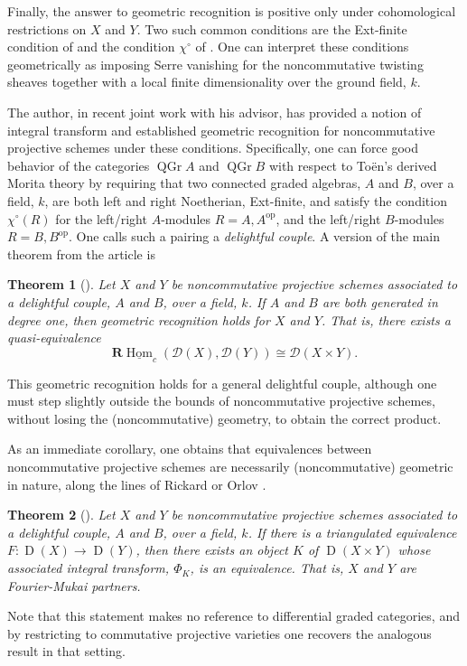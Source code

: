 \documentclass[12pt]{amsart}
\newtheorem*{theorem*}{Theorem}
\theoremstyle{definition}
\begin{document}
Finally, the answer to geometric recognition is positive only under cohomological restrictions on \(X\) and \(Y\).
Two such common conditions are the Ext-finite condition of \cite{BVdB} and the condition $\chi^\circ$ of \cite{AZ94}.
One can interpret these conditions geometrically as imposing Serre vanishing for the noncommutative twisting sheaves together with a local finite dimensionality over the ground field, $k$.

The author, in recent joint work with his advisor, has provided a notion of integral transform and established geometric recognition for noncommutative projective schemes under these conditions.
Specifically, one can force good behavior of the categories \(\operatorname{QGr} A\) and \(\operatorname{QGr} B\) with respect to To\"en's derived Morita theory by requiring that two connected graded algebras, $A$ and $B$, over a field, $k$, are both left and right Noetherian, Ext-finite, and satisfy the condition $\chi^\circ(R)$ for the left/right $A$-modules $R = A, A^{\operatorname{op}}$, and the left/right $B$-modules $R = B, B^{\operatorname{op}}$.
One calls such a pairing a \textit{delightful couple}.
A version of the main theorem from the article is

\begin{tcolorbox}
  \begin{theorem*}[\cite{BF17}]
    Let \(X\) and \(Y\) be noncommutative projective schemes associated to a delightful couple, \(A\) and \(B\), over a field, \(k\).
    If \(A\) and \(B\) are both generated in degree one, then geometric recognition holds for \(X\) and \(Y\).
    That is, there exists a quasi-equivalence
    \[\mathbf{R}\underline{\operatorname{Hom}}_c(\mathcal{D}(X), \mathcal{D}(Y)) \cong \mathcal{D}(X \times Y).\]
  \end{theorem*}
\end{tcolorbox}
This geometric recognition holds for a general delightful couple, although one must step slightly outside the bounds of noncommutative projective schemes, without losing the (noncommutative) geometry, to obtain the correct product.

As an immediate corollary, one obtains that equivalences between noncommutative projective schemes are necessarily (noncommutative) geometric in nature, along the lines of Rickard \cite{Rickard} or Orlov \cite{Orlov1997}.

\begin{tcolorbox}
  \begin{theorem*}[\cite{BF17}]
    Let \(X\) and \(Y\) be noncommutative projective schemes associated to a delightful couple, \(A\) and \(B\), over a field, \(k\).
    If there is a triangulated equivalence \(F \colon \operatorname{D}(X) \to \operatorname{D}(Y)\), then there exists an object \(K\) of \(\operatorname{D}(X \times Y)\) whose associated integral transform, \(\Phi_K\), is an equivalence.
    That is, \(X\) and \(Y\) are Fourier-Mukai partners.
  \end{theorem*}
\end{tcolorbox}
Note that this statement makes no reference to differential graded categories, and by restricting to commutative projective varieties one recovers the analogous result in that setting.
\end{document}
